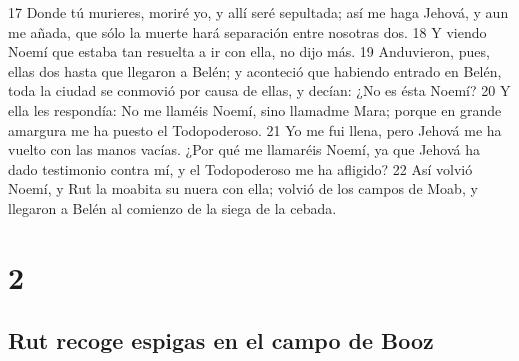 17 Donde tú murieres, moriré yo, y allí seré sepultada; así me haga Jehová, y aun me añada, que sólo la muerte hará separación entre nosotras dos. 
18 Y viendo Noemí que estaba tan resuelta a ir con ella, no dijo más.
19 Anduvieron, pues, ellas dos hasta que llegaron a Belén; y aconteció que habiendo entrado en Belén, toda la ciudad se conmovió por causa de ellas, y decían: ¿No es ésta Noemí?
20 Y ella les respondía: No me llaméis Noemí, sino llamadme Mara; porque en grande amargura me ha puesto el Todopoderoso.
21 Yo me fui llena, pero Jehová me ha vuelto con las manos vacías. ¿Por qué me llamaréis Noemí, ya que Jehová ha dado testimonio contra mí, y el Todopoderoso me ha afligido?
22 Así volvió Noemí, y Rut la moabita su nuera con ella; volvió de los campos de Moab, y llegaron a Belén al comienzo de la siega de la cebada.

\chapter{2}

\section*{Rut recoge espigas en el campo de Booz}


